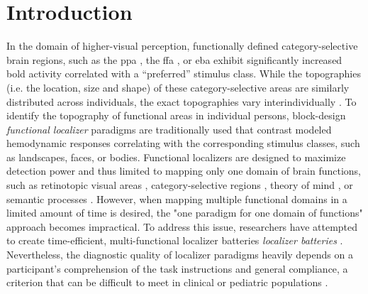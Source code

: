 \section{Introduction}

In the domain of higher-visual perception, functionally defined
category-selective brain regions, such as the \ac{ppa} \citep{epstein1998ppa},
the \ac{ffa} \citep{kanwisher1997ffa}, or \ac{eba} \citep{downing2001bodyarea}
exhibit significantly increased \ac{bold} activity correlated with a
``preferred'' \citep{debeck2008interpreting} stimulus class.
%
While the topographies (i.e. the location, size and shape) of these
category-selective areas are similarly distributed across individuals, the exact
topographies vary interindividually \citep{rosenke2021probabilistic,
zhen2017quantifying, zhen2015quantifying, frost2012measuring}.
To identify the topography of functional areas in individual persons,
block-design \textit{functional localizer} paradigms are traditionally used that
contrast modeled hemodynamic responses correlating with the corresponding
stimulus classes, such as landscapes, faces, or bodies.
Functional localizers are designed to maximize detection power and thus limited
to mapping only one domain of brain functions, such as retinotopic visual areas
\citep{wang2015probabilistic}, category-selective regions
\citep{stigliani2015temporal}, theory of mind \citep{spunt2014validating}, or
semantic processes \citep{fedorenko2010new, fernandez2001language}.
However, when mapping multiple functional domains in a limited amount of time is
desired, the "one paradigm for one domain of functions" approach becomes
impractical.
To address this issue, researchers have attempted to create time-efficient,
multi-functional localizer batteries \textit{localizer batteries}
\citep[e.g.,][]{barch2013function, drobyshevsky2006rapid, pinel2007fast}.
Nevertheless, the diagnostic quality of localizer paradigms heavily depends on a
participant's comprehension of the task instructions and general compliance, a
criterion that can be difficult to meet in clinical or pediatric populations
\citep{eickhoff2020towards, vanderwal2019movies}.

